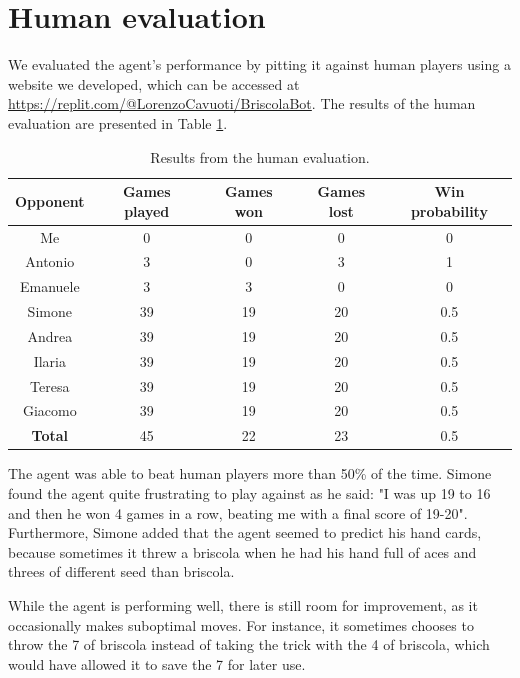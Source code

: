 \section{Human evaluation}
We evaluated the agent's performance by pitting it against human players using a website we developed, which can be accessed at \url{https://replit.com/@LorenzoCavuoti/BriscolaBot}. The results of the human evaluation are presented in Table \ref{tab:human-evaluation}.

\begin{table}[H]
    \centering
    \begin{tabular}{ccccc}
        \hline
        Opponent & Games played & Games won & Games lost & Win probability \\
        \hline
        Me & 0 & 0 & 0 & 0 \\
        Antonio & 3 & 0 & 3 & 1 \\
        Emanuele & 3 & 3 & 0 & 0 \\
        Simone & 39 & 19 & 20 & 0.5 \\
        Andrea & 39 & 19 & 20 & 0.5 \\
        Ilaria & 39 & 19 & 20 & 0.5 \\
        Teresa & 39 & 19 & 20 & 0.5 \\
        Giacomo & 39 & 19 & 20 & 0.5 \\
        \hline
        \textbf{Total} & 45 & 22 & 23 & 0.5 \\
    \end{tabular}
    \caption{Results from the human evaluation.}
    \label{tab:human-evaluation}
\end{table}


The agent was able to beat human players more than 50\% of the time.
Simone found the agent quite frustrating to play against as he said: "I was up 19 to 16 and then he won 4 games in a row, beating me with a final score of 19-20". Furthermore, Simone added that the agent seemed to predict his hand cards, because sometimes it threw a briscola when he had his hand full of aces and threes of different seed than briscola.

While the agent is performing well, there is still room for improvement, as it occasionally makes suboptimal moves. For instance, it sometimes chooses to throw the 7 of briscola instead of taking the trick with the 4 of briscola, which would have allowed it to save the 7 for later use.

